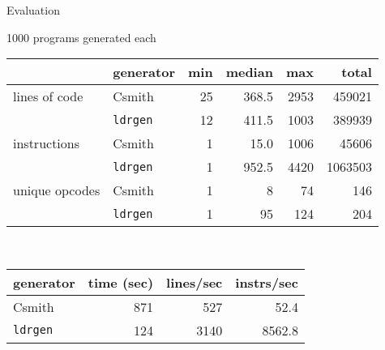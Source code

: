 \documentclass{beamer}
\newcommand\ldrgen{\texttt{ldrgen}}
\begin{document}
\begin{frame}{Evaluation}

1000 programs generated each \\[2em]

\centering
\begin{tabular}{l@{\ } | @{\ }l @{\quad} r @{\quad} r @{\quad} r @{\quad} r}

& generator & min & median & max & total \\
\hline
lines of code & Csmith
    & 25 & 368.5 & 2953 & 459021 \\
& \ldrgen
    & 12 & 411.5 & 1003 & 389939
    \\[.5ex]
\pause
instructions & Csmith
    & 1 &  15.0 & 1006 &   45606 \\
& \ldrgen
    & 1 & 952.5 & 4420 & 1063503
    \\[.5ex]
\pause
unique opcodes & Csmith
    & 1 &  8 &  74 & 146 \\
& \ldrgen
    & 1 & 95 & 124 & 204
    \\

\end{tabular}

\pause \mbox{}\\[2em]
\begin{tabular}{l@{\ } | @{\ }r@{\quad}r@{\quad}r}
    generator & time (sec) & lines/sec & instrs/sec \\
    \hline
    Csmith & 871 &  527 & 52.4 \\
    \ldrgen & 124 & 3140 & 8562.8
\end{tabular}


\end{frame}


\end{document}
